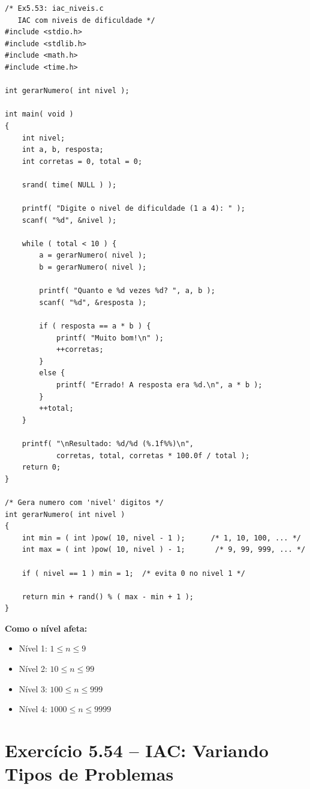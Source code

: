 \documentclass[12pt,a4paper]{article}
\begin{document}
\begin{respostabox}
\begin{lstlisting}
/* Ex5.53: iac_niveis.c
   IAC com niveis de dificuldade */
#include <stdio.h>
#include <stdlib.h>
#include <math.h>
#include <time.h>

int gerarNumero( int nivel );

int main( void )
{
    int nivel;
    int a, b, resposta;
    int corretas = 0, total = 0;

    srand( time( NULL ) );

    printf( "Digite o nivel de dificuldade (1 a 4): " );
    scanf( "%d", &nivel );

    while ( total < 10 ) {
        a = gerarNumero( nivel );
        b = gerarNumero( nivel );

        printf( "Quanto e %d vezes %d? ", a, b );
        scanf( "%d", &resposta );

        if ( resposta == a * b ) {
            printf( "Muito bom!\n" );
            ++corretas;
        }
        else {
            printf( "Errado! A resposta era %d.\n", a * b );
        }
        ++total;
    }

    printf( "\nResultado: %d/%d (%.1f%%)\n",
            corretas, total, corretas * 100.0f / total );
    return 0;
}

/* Gera numero com 'nivel' digitos */
int gerarNumero( int nivel )
{
    int min = ( int )pow( 10, nivel - 1 );      /* 1, 10, 100, ... */
    int max = ( int )pow( 10, nivel ) - 1;       /* 9, 99, 999, ... */

    if ( nivel == 1 ) min = 1;  /* evita 0 no nivel 1 */

    return min + rand() % ( max - min + 1 );
}
\end{lstlisting}

\textbf{Como o nível afeta:}
\begin{itemize}[noitemsep]
  \item Nível 1: $1 \leq n \leq 9$
  \item Nível 2: $10 \leq n \leq 99$
  \item Nível 3: $100 \leq n \leq 999$
  \item Nível 4: $1000 \leq n \leq 9999$
\end{itemize}
\end{respostabox}

\newpage

\section{Exercício 5.54 -- IAC: Variando Tipos de Problemas}
\end{document}
